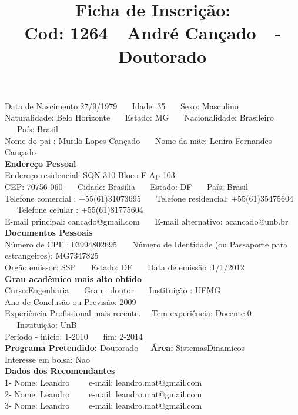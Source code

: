 \documentclass[11pt]{article}
\title{\vspace*{-4cm} Ficha de Inscrição: \\Cod: 1264\ \ André Cançado\ \ - \ \ Doutorado 
 }
\date{}
\begin{document}
\maketitle
\vspace*{-1.5cm}
\noindent Data de Nascimento:27/9/1979
\ \ \ Idade: 35   \ \ \ Sexo: Masculino
\\
Naturalidade: Belo Horizonte  
\ \ \  Estado: MG
\ \ \  Nacionalidade: Brasileiro
\ \ \ País: Brasil
\\        
Nome do pai : Murilo Lopes Cançado
\ \ \ Nome da mãe: Lenira Fernandes Cançado          
\\[0.2cm]                     
\textbf{Endereço Pessoal} 
\\ 
\noindent Endereço residencial: SQN 310 Bloco F Ap 103
\\
        CEP: 70756-060 
\ \ \ Cidade: Brasília 
\ \ \ Estado: DF 
\ \ \ País: Brasil
\\		
		Telefone comercial : +55(61)31073695
\ \ \ Telefone residencial: +55(61)35475604
\ \ \ Telefone celular : +55(61)81775604
\\
E-mail principal: cancado@gmail.com
\ \ \ E-mail alternativo: acancado@unb.br 
\\[0.2cm] 
\textbf{Documentos Pessoais}
\\
\noindent Número de CPF : 03994802695
\ \ \ Número de Identidade (ou Passaporte para estrangeiros): MG7347825
\\
Orgão emissor: SSP
\ \ \ Estado: DF
\ \ \ Data de emissão :1/1/2012
\\[0.3cm]
\textbf{Grau acadêmico mais alto obtido}
\\	
Curso:Engenharia
\ \ \ Grau : doutor
\ \ \ Instituição : UFMG
\\			
Ano de Conclusão ou Previsão: 2009
\\ 
Experiência Profissional mais recente. \ \  
Tem experiência: Docente 0  
\ \ \ Instituição: UnB
\\  
Período - início: 1-2010
\ \ \ fim: 2-2014
\\[0.2cm] 
\textbf{Programa Pretendido:} Doutorado\ \ \ \textbf{Área:} SistemasDinamicos\\
Interesse em bolsa: Nao
\\[0.3cm]		
\textbf{Dados dos Recomendantes} 
\\
1- Nome: Leandro
\ \ \ \  e-mail: leandro.mat@gmail.com 
\\
2- Nome: Leandro
\ \ \ \ e-mail: leandro.mat@gmail.com
\\
3- Nome: Leandro
\ \ \ \ e-mail: leandro.mat@gmail.com
\end{document}
